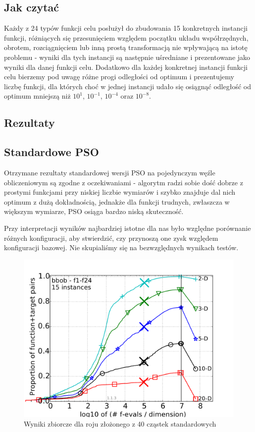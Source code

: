 \documentclass[12pt, twoside, openany, abstract=on]{report}
\theoremstyle{definition}
\begin{document}
\subsection{Jak czytać}
Każdy z 24 typów funkcji celu posłużył do zbudowania 15 konkretnych instancji funkcji, różniących się przesunięciem względem początku układu współrzędnych, obrotem, rozciągnięciem lub inną prostą transformacją nie wpływającą na istotę problemu - wyniki dla tych instancji są następnie uśredniane i prezentowane jako wyniki dla danej funkcji celu. Dodatkowo dla każdej konkretnej instancji funkcji celu bierzemy pod uwagę różne progi odległości od optimum i prezentujemy liczbę funkcji, dla których choć w jednej instancji udało się osiągnąć odległość od optimum mniejszą niż $10^{1}$, $10^{-1}$, $10^{-4}$ oraz $10^{-8}$.

\subsection{Rezultaty}

\subsection{Standardowe PSO}
Otrzymane rezultaty standardowej wersji PSO na pojedynczym węźle obliczeniowym są zgodne z oczekiwaniami - algorytm radzi sobie dość dobrze z prostymi funkcjami przy niskiej liczbie wymiarów i szybko znajduje dal nich optimum z dużą dokładnością, jednakże dla funkcji trudnych, zwłaszcza w większym wymiarze, PSO osiąga bardzo niską skuteczność.

Przy interpretacji wyników najbardziej istotne dla nas było względne porównanie różnych konfiguracji, aby stwierdzić, czy przynoszą one zysk względem konfiguracji bazowej. Nie skupialiśmy się na bezwzględnych wynikach testów.

\begin{figure}[H]
    \centering
    \includegraphics[scale=.75]{charts/1node40st.pdf} 
 \caption{Wyniki zbiorcze dla roju złożonego z 40 cząstek standardowych}
\end{figure}
\end{document}
